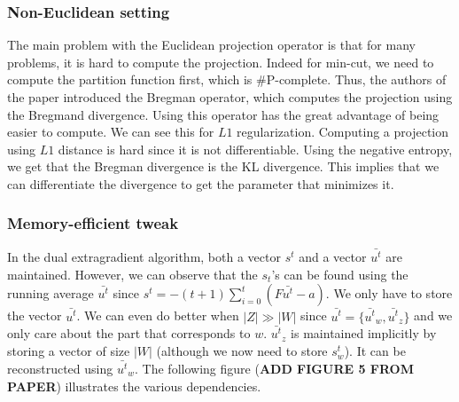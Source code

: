 \subsubsection{Non-Euclidean setting}
The main problem with the Euclidean projection operator is that for many
problems, it is hard to compute the projection. Indeed for min-cut, we need to
compute the partition function first, which is \#P-complete. Thus, the authors
of the paper introduced the Bregman operator, which computes the projection
using the Bregmand divergence. Using this operator has the great advantage of
being easier to compute. We can see this for $L1$ regularization. Computing a
projection using $L1$ distance is hard since it is not differentiable. Using the
negative entropy, we get that the Bregman divergence is the KL divergence. This
implies that we can differentiate the divergence to get the parameter that
minimizes it.

\subsubsection{Memory-efficient tweak}
In the dual extragradient algorithm, both a vector $s^t$ and a vector
$\bar{u^t}$ are maintained. However, we can observe that the $s_t$'s can be
found using the running average $\bar{u^t}$ since $s^t = -(t + 1 ) \sum_{i=0}^t
(F \bar{u^t} - a)$. We only have to store the vector $\bar{u^t}$. We can even do
better when $|{Z}| \gg |{W}|$ since $\bar{u^t} = \{
\bar{u^t}_w,\bar{u^t}_z \}$ and we only care about the part that corresponds to
$w$. $\bar{u^t}_z$ is maintained implicitly by storing a vector of size
$|{W}|$ (although we now need to store $s_w^t$). It can be reconstructed
using $\bar{u^t}_w$. The following figure (\textbf{ADD FIGURE 5 FROM PAPER})
illustrates the various dependencies.

